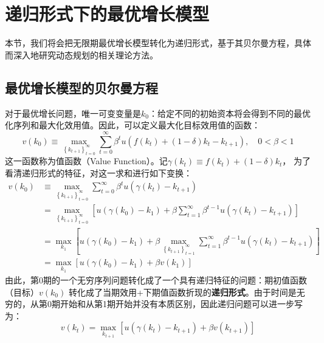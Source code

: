 \section{递归形式下的最优增长模型}  \label{sec-fe-rck}

本节，我们将会把无限期最优增长模型转化为递归形式，基于其贝尔曼方程，具体而深入地研究动态规划的相关理论方法。

\subsection{最优增长模型的贝尔曼方程} \label{subsec-bellman-rck}

对于最优增长问题，唯一可变变量是$k_0$：给定不同的初始资本将会得到不同的最优化序列和最大化效用值。因此，可以定义最大化目标效用值的函数：
\begin{equation*}
    v\left(k_0\right) \equiv 
        \max _{\left\{k_{t+1}\right\}_{t=0}^{\infty}} 
        \sum_{t=0}^{\infty} \beta^t u\left(f\left(k_t\right)+\left(1-\delta\right)k_t-k_{t+1}\right), \quad 0<\beta<1
\end{equation*}
这一函数称为值函数（Value Function）。记$\gamma\left(k_t\right)\equiv f\left(k_t\right)+\left(1-\delta\right)k_t$，
为了看清递归形式的特征，对这一求和进行如下变换：
\begin{equation}
    \begin{aligned}
        v\left(k_0\right) & \equiv 
            \max _{\left\{k_{t+1}\right\}_{t=0}^{\infty}} \sum_{t=0}^{\infty} \beta^t u\left(\gamma\left(k_t\right)-k_{t+1}\right) \\
        & =\max _{\left\{k_{t+1}\right\}_{t=0}^{\infty}}\left[u\left(\gamma\left(k_0\right)-k_1\right)+
            \beta \sum_{t=1}^{\infty} \beta^{t-1} u\left(\gamma\left(k_t\right)-k_{t+1}\right)\right] \\
        & =\max _{k_1}\left[u\left(\gamma\left(k_0\right)-k_1\right)+
            \beta \max _{\left\{k_{t+1}\right\}_{t=1}^{\infty}} 
                \sum_{t=1}^{\infty} \beta^{t-1} u\left(\gamma\left(k_t\right)-k_{t+1}\right)\right] \\
        & =\max _{k_1}\left[u\left(\gamma\left(k_0\right)-k_1\right)+\beta v\left(k_1\right)\right]
    \end{aligned}
\end{equation}
由此，第0期的一个无穷序列问题转化成了一个具有递归特征的问题：期初值函数（目标）$v\left(k_0\right)$
转化成了当期效用+下期值函数折现的\textbf{递归形式}。由于时间是无穷的，从第0期开始和从第1期开始并没有本质区别，因此递归问题可以进一步写为：
\begin{equation*}
    v\left(k_t\right)=\max _{k_{t+1}}\left[u\left(\gamma\left(k_t\right)-k_{t+1}\right)+\beta v\left(k_{t+1}\right)\right]
\end{equation*}

